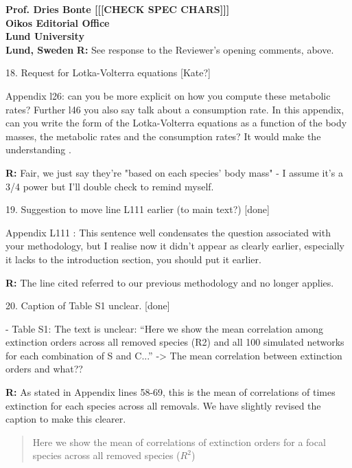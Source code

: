 \documentclass[12pt]{letter}
\begin{document}
\begin{letter}{\bf Prof. Dries Bonte [[[CHECK SPEC CHARS]]]\\
Oikos Editorial Office \\
Lund University \\
Lund, Sweden}
      \textbf{R:} See response to the Reviewer's opening comments, above.


    18. Request for Lotka-Volterra equations [Kate?]

      Appendix l26: can you be more explicit on how you compute these metabolic rates? Further l46 you also say talk about a consumption rate. In this appendix, can you write the form of the Lotka-Volterra equations as a function of the body masses, the metabolic rates and the consumption rates? It would make the understanding .

      \textbf{R:}
      Fair, we just say they're "based on each species' body mass" - I assume it's a 3/4 power but I'll double check to remind myself.


    19. Suggestion to move line L111 earlier (to main text?) [done]

      Appendix L111 : This sentence well condensates the question associated with your methodology, but I realise now it didn’t appear as clearly earlier, especially it lacks to the introduction section, you should put it earlier.


      \textbf{R:} The line cited referred to our previous methodology and no longer applies.


    20. Caption of Table S1 unclear. [done]

      - Table S1: The text is unclear: ``Here we show the mean correlation among
      extinction orders across all removed species (R2) and all 100 simulated networks for each combination of S and C...'' -> The mean correlation between extinction orders and what??


      \textbf{R:} As stated in Appendix lines 58-69, this is the mean of correlations of times extinction for each species across all removals. We have slightly revised the caption to make this clearer.


      \begin{quotation}
        Here we show the mean of correlations of extinction orders for a focal species across all removed species ($R^2$)
      \end{quotation}


\end{letter}
\end{document}
